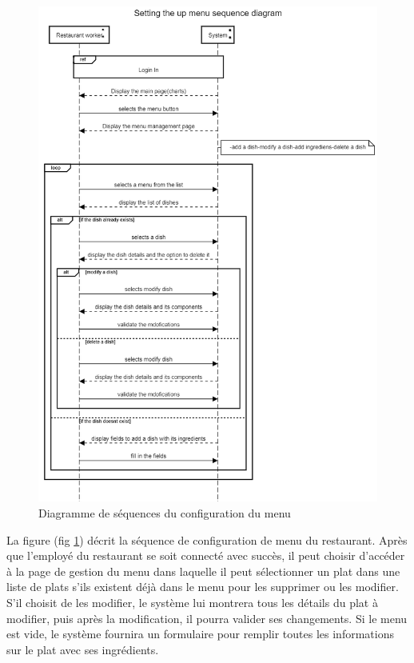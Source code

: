 \documentclass[french, a4paper, 12pt]{report}
\begin{document}
			\newpage	
			\begin{figure}[!h]
  				\center
  				\includegraphics[width=12cm]{seqmenu.png}
  				\caption{Diagramme de séquences du configuration du menu}
  				\label{fig:seqmenu}
			\end{figure} La figure (fig \ref{fig:seqmenu}) décrit la séquence de configuration de menu du restaurant. Après que l'employé du restaurant se soit connecté avec succès, il peut choisir d'accéder à la page de gestion du menu dans laquelle il peut sélectionner un plat dans une liste de plats s'ils existent déjà dans le menu pour les supprimer ou les modifier. S'il choisit de les modifier, le système lui montrera tous les détails du plat à modifier, puis après la modification, il pourra valider ses changements. Si le menu est vide, le système fournira un formulaire pour remplir toutes les informations sur le plat avec ses ingrédients.
			
\end{document}
